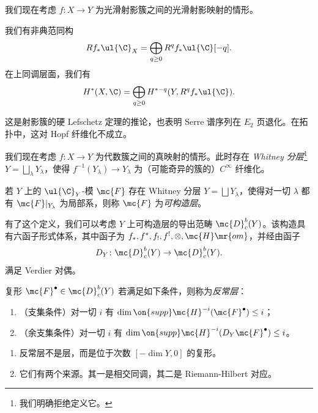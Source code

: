 我们现在考虑 \(f \colon X \to Y\) 为光滑射影簇之间的光滑射影映射的情形。

\begin{thm}
    我们有非典范同构
    \[ R f_* \ul{\C}_X = \bigoplus_{q \geq 0} R^q f_* \ul{\C}[-q]. \]
    在上同调层面，我们有
    \[ H^*(X, \C) = \bigoplus_{q \geq 0} H^{*-q}(Y, R^q f_* \ul{\C}). \]
\end{thm}

这是射影簇的硬 Lefschetz 定理的推论，也表明 Serre 谱序列在 \(E_2\) 页退化。在拓扑中，这对 Hopf 纤维化不成立。

我们现在考虑 \(f \colon X \to Y\) 为代数簇之间的真映射的情形。此时存在 \textit{Whitney 分层}\footnote{我们明确拒绝定义它。} \(Y = \bigsqcup_{\lambda} Y_{\lambda}\)，使得 \(f^{-1}(Y_{\lambda}) \to Y_{\lambda}\) 为（可能奇异的簇的）\(C^{\infty}\) 纤维化。

\begin{defn}
    若 \(Y\) 上的 \(\ul{\C}_Y\)-模 \(\mc{F}\) 存在 Whitney 分层 \(Y = \bigsqcup Y_{\lambda}\)，使得对一切 \(\lambda\) 都有 \(\mc{F}|_{Y_{\lambda}}\) 为局部系，则称 \(\mc{F}\) 为\textit{可构造层}。
\end{defn}

有了这个定义，我们可以考虑 \(Y\) 上可构造层的导出范畴 \(\mc{D}_c^b(Y)\)。该构造具有六函子形式体系，其中函子为 \(f_*, f^*, f_!, f^!, \otimes, \mc{H}\mr{om}\)，并经由函子
\[ D_Y \colon \mc{D}_c^b(Y) \to \mc{D}_c^b(Y). \]
满足 Verdier 对偶。

\begin{defn}
    复形 \(\mc{F}^{\bullet} \in \mc{D}_c^b(Y)\) 若满足如下条件，则称为\textit{反常层}：
    \begin{enumerate}
        \item （支集条件）对一切 \(i\) 有 \(\dim \on{supp} \mc{H}^{-i}(\mc{F}^{\bullet}) \leq i\)；
        \item （余支集条件）对一切 \(i\) 有 \(\dim \on{supp} \mc{H}^{-i}(D_Y \mc{F}^{\bullet}) \leq i\)。
    \end{enumerate}
\end{defn}

\begin{rmks}\leavevmode
    \begin{enumerate}
        \item 反常层不是层，而是位于次数 \([-\dim Y, 0]\) 的复形。
        \item 它们有两个来源。其一是相交同调，其二是 Riemann-Hilbert 对应。
    \end{enumerate}
\end{rmks}

